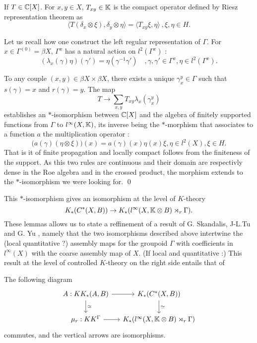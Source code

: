 \begin{dem}
If $T\in \mathbb C[X]$. For $x,y\in X$, $T_{xy}\in \mathbb K$ is the compact operator defined by Riesz representation theorem as 
\[\langle T(\delta_x \otimes \xi),\delta_y \otimes \eta\rangle =\langle T_{xy}\xi,\eta\rangle \ ,\xi, \eta\in H.\]

Let us recall how one construct the left regular representation of $\Gamma$. For $x\in \Gamma^{(0)}=\beta X$, $\Gamma^x$ has a natural action on $l^2(\Gamma^x)$ :
\[(\lambda_x(\gamma)\eta)(\gamma')=\eta(\gamma^{-1}\gamma')\quad,\gamma,\gamma'\in \Gamma^x,\eta\in l^2(\Gamma^x) .\] 

To any couple $(x,y)\in \beta X\times \beta X$, there exists a unique $\gamma_x^y\in \Gamma$ such that $s(\gamma)=x$ and $r(\gamma)=y$. The map
\[T\rightarrow \sum_{x,y} T_{xy} \lambda_x(\gamma_x^y)\]
establishes an $*$-isomorphism between $\mathbb C[X]$ and the algebra of finitely supported functions from $\Gamma$ to $l^\infty(X,\mathbb K)$, its inverse being the $*$-morphism that associates to a function $a$ the multiplication operator : 
\[\big(a(\gamma)(\eta\otimes \xi)\big) (x)= a(\gamma)(x)\eta(x)\xi , \eta\in l^2(X),\xi\in H. \]
That is it of finite propagation and locally compact follows from the finiteness of the support. As this two rules are continuous and their domain are respectivly dense in the Roe algebra and in the crossed product, the morphism extends to the $*$-isomorphism we were looking for.
\qed
\end{dem}

This $*$-isomorphism gives an isomorphism at the level of $K$-theory 
\[ K_*(C^* (X,B))\rightarrow K_*(l^\infty(X,\mathbb K\otimes B)\rtimes_r \Gamma).\]
These lemmas allows us to state a reffinement of a result of G. Skandalis, J-L.Tu and G. Yu \cite{SkTuYu}, namely that the two isomorphisms described above intertwine the (local quantitative ?) assembly maps for the groupoid $\Gamma$ with coefficients in $l^\infty(X)$ with the coarse assembly map of $X$. (If local and quantitative :) This result at the level of controlled $K$-theory on the right side entails that of \cite{SkTuYu}

\begin{thm}
The following diagram
\[\begin{tikzcd}[column sep = small]
A : KK_*(A,B)\arrow{r}\arrow{d}{\simeq} & K_*(C^*(X,B)) \arrow{d}{\simeq}\\
\mu_{r} : KK^\Gamma \arrow{r} & K_*(l^\infty(X,\K\otimes B)\rtimes_r \Gamma)
\end{tikzcd}\]
commutes, and the vertical arrows are isomorphisms.
\end{thm}



















